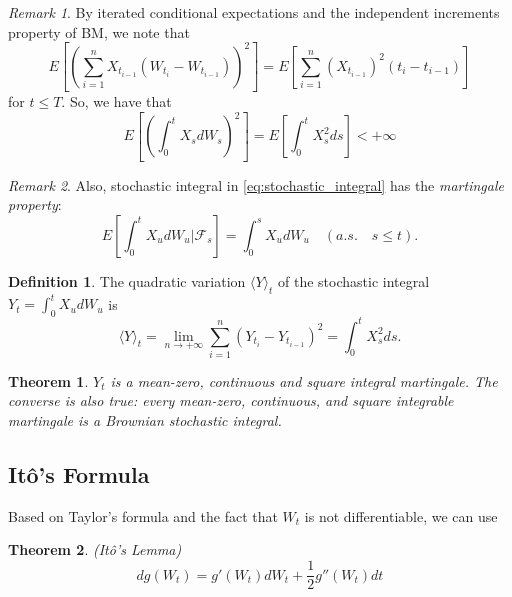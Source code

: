 \documentclass[a4paper,12pt]{article}
\numberwithin{equation}{section}
\newtheorem{theorem}{Theorem}[section]
\theoremstyle{definition}
\newtheorem{definition}{Definition}[section]
\theoremstyle{remark}
\newtheorem{remark}{Remark}[section]
\begin{document}
\begin{remark}
By iterated conditional expectations and the independent 
increments property of BM, we note that 
\begin{equation}
    E\left[\left(\sum_{i=1}^{n}X_{t_{i-1}}
    (W_{t_i}-W_{t_{i-1}})\right)^{2} \right]
    = E\left[\sum_{i=1}^{n}(X_{t_{i-1}})^{2}(t_{i}-t_{i-1})\right]
\end{equation}
for $t\leq T$. So, we have that 
\begin{equation}
\label{eq:stochastic_integral_expectation}
    E\left[\left( \int_{0}^{t} X_s dW_s \right)^2 \right]
    = E\left[ \int_{0}^{t} X_s^2 ds \right] < +\infty
\end{equation}
\end{remark}

\begin{remark}
Also, stochastic integral in \eqref{eq:stochastic_integral} has the 
\textit{martingale property}:
\begin{equation}
\label{eq:stochastic_integral_martingale}
    E\left[\int_{0}^{t} X_u dW_{u} | \mathcal{F}_{s}\right]
    = \int_{0}^{s} X_u dW_u \quad (a.s.\quad s\leq t).
\end{equation}
\end{remark}

\begin{definition}
The quadratic variation $\langle Y \rangle_t$ of the stochastic 
integral $Y_t = \int_{0}^{t} X_u dW_u$ is 
\begin{equation}
\label{eq:stochastic_integral_QV}
    \langle Y \rangle_t = \lim_{n\rightarrow+\infty} \sum_{i=1}^{n} (Y_{t_i} - Y_{t_{i-1}})^2
    = \int_{0}^{t} X_s^2 ds.
\end{equation}
\end{definition}

\begin{theorem}
$Y_t$ is a mean-zero, continuous and square integral martingale. 
The converse is also true: every mean-zero, continuous, and square 
integrable martingale is a Brownian stochastic integral.
\end{theorem}

\subsection{It\^o's Formula}
Based on Taylor's formula and the fact that $W_t$ is not 
differentiable, we can use 

\begin{theorem}
(It\^o's Lemma)
\begin{equation}
\label{eq:ito_BM}
    dg(W_t) = g'(W_t)dW_t + \frac{1}{2}g''(W_t)dt
\end{equation}
\end{theorem}
\end{document}
